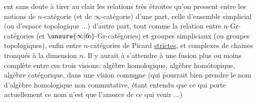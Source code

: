 
ent sans doute à tirer au clair les relations très étroites qu'on pressent entre les notions de $n$-catégorie (et de $\infty$-catégorie) d'une part, celle d'ensemble simplicial (ou d'espace topologique ...) d'autre part, tout comme la relation entre $n$-Gr-catégories (et $\unsure{\infty|6\!o}$-Gr-catégories) et groupes simpliciaux (ou groupes topologiques), enfin entre   $n$-catégories de Picard \uline{strictes}, et  complexes de chaines tronqués à la dimension $n$. Il y aurait à s'attendre à une fusion plus ou moins complète entre ces trois visions: algèbre homologique, algèbre homótopique, algèbre catégorique, dans une vision comm\uline{u}ne (qui pourrait bien prendre le nom d'algèbre homologique non commutative, étant entendu que ce qui porte actuellement ce nom n'est que l'amorce de ce qui   venir ...)

